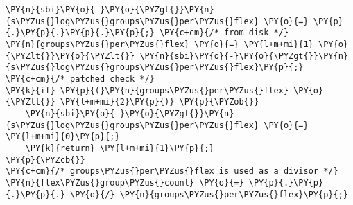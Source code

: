 \begin{Verbatim}[commandchars=\\\{\},codes={\catcode`\$=3\catcode`\^=7\catcode`\_=8}]
\PY{n}{sbi}\PY{o}{-}\PY{o}{\PYZgt{}}\PY{n}{s\PYZus{}log\PYZus{}groups\PYZus{}per\PYZus{}flex} \PY{o}{=} \PY{p}{.}\PY{p}{.}\PY{p}{.}\PY{p}{;} \PY{c+cm}{/* from disk */}
\PY{n}{groups\PYZus{}per\PYZus{}flex} \PY{o}{=} \PY{l+m+mi}{1} \PY{o}{\PYZlt{}}\PY{o}{\PYZlt{}} \PY{n}{sbi}\PY{o}{-}\PY{o}{\PYZgt{}}\PY{n}{s\PYZus{}log\PYZus{}groups\PYZus{}per\PYZus{}flex}\PY{p}{;}
\PY{c+cm}{/* patched check */}
\PY{k}{if} \PY{p}{(}\PY{n}{groups\PYZus{}per\PYZus{}flex} \PY{o}{\PYZlt{}} \PY{l+m+mi}{2}\PY{p}{)} \PY{p}{\PYZob{}}
    \PY{n}{sbi}\PY{o}{-}\PY{o}{\PYZgt{}}\PY{n}{s\PYZus{}log\PYZus{}groups\PYZus{}per\PYZus{}flex} \PY{o}{=} \PY{l+m+mi}{0}\PY{p}{;}
    \PY{k}{return} \PY{l+m+mi}{1}\PY{p}{;}
\PY{p}{\PYZcb{}}
\PY{c+cm}{/* groups\PYZus{}per\PYZus{}flex is used as a divisor */}
\PY{n}{flex\PYZus{}group\PYZus{}count} \PY{o}{=} \PY{p}{.}\PY{p}{.}\PY{p}{.} \PY{o}{/} \PY{n}{groups\PYZus{}per\PYZus{}flex}\PY{p}{;}
\end{Verbatim}
